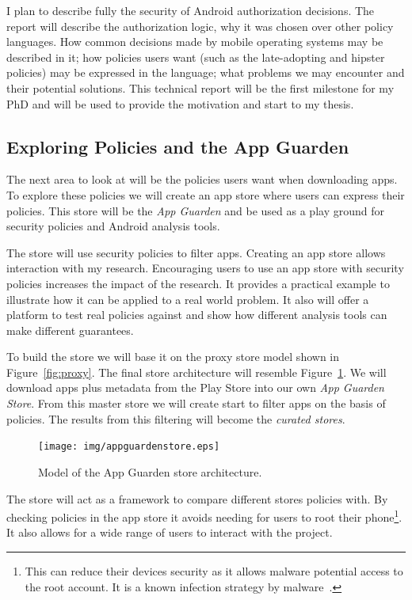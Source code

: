 \documentclass[a4paper]{article}
\begin{document}
I plan to describe fully the security of Android authorization decisions. The
report will describe the authorization logic, why it was chosen over other
policy languages.  How common decisions made by mobile operating systems may be
described in it; how policies users want (such as the late-adopting and hipster
policies) may be expressed in the language; what problems we may encounter and
their potential solutions.  This technical report will be the first milestone
for my PhD and will be used to provide the motivation and start to my thesis.


\subsection{Exploring Policies and the App Guarden}

The next area to look at will be the policies users want when downloading apps.
To explore these policies we will create an app store where users can express
their policies.  This store will be the \emph{App Guarden} and be used as a play
ground for security policies and Android analysis tools.

The store will use security policies to filter apps.  Creating an app store
allows interaction with my research.  Encouraging users to use an app store with
security policies increases the impact of the research. It provides a practical
example to illustrate how it can be applied to a real world problem.  It also
will offer a platform to test real policies against and show how different
analysis tools can make different guarantees.  

To build the store we will base it on the proxy store model shown in
Figure~\ref{fig:proxy}.  The final store architecture will resemble
Figure~\ref{fig:appguardenstore}.  We will download apps plus metadata from the Play Store
into our own \emph{App Guarden Store}.  From this master store we will create
start to filter apps on the basis of policies.  The results from this filtering
will become the \emph{curated stores}. 

\begin{figure}
  \centering
  \texttt{[image: img/appguardenstore.eps]}
  \caption{Model of the App Guarden store architecture.}
  \label{fig:appguardenstore}
\end{figure}

The store will act as a framework to compare different stores
policies with.  By checking policies in the app store it avoids
needing for users to root their phone\footnote{This can reduce their
devices security as it allows malware potential access to the root account.  It
is a known infection strategy by malware~\cite{Svajcer:2012wy}.}.
It also allows for a wide range of users to interact with the project. 
\end{document}
